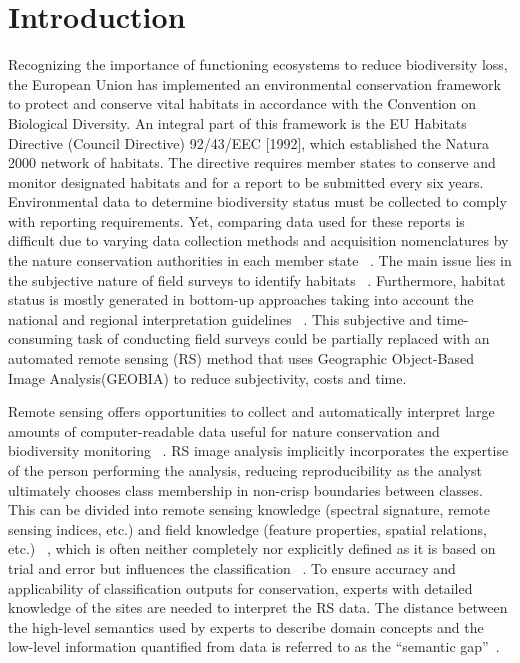 \documentclass[authoryear,preprint,12pt,number]{elsarticle}
\begin{document}
\section{Introduction}
Recognizing the importance of functioning ecosystems to reduce biodiversity 
loss, the European Union has implemented an environmental conservation 
framework to protect and conserve vital habitats in accordance with the 
Convention on Biological Diversity. An integral part of this framework is the 
EU Habitats Directive (Council Directive) 92/43/EEC [1992], which established 
the Natura 2000 network of habitats. The directive requires member states to 
conserve and monitor designated habitats and for a report to be submitted every 
six years. Environmental data to determine biodiversity status must be 
collected to comply with reporting requirements. Yet, comparing data used for 
these reports is difficult due to varying data collection methods and 
acquisition nomenclatures by the nature conservation authorities in each member 
state ~\citep{VandenBorre2011}. The main issue lies in the subjective nature of 
field surveys to identify habitats ~\citep{Cherrill1999, Cherrill1999a, 
Hearn2011, Nieland2015a}. Furthermore, habitat status is mostly 
generated in 
bottom-up approaches taking into account the national and regional 
interpretation guidelines ~\citep{VandenBorre2011, INSPIREdataspecs}. This 
subjective and time-consuming task of conducting field surveys could be 
partially replaced with an automated remote sensing (RS) method that uses 
Geographic Object-Based Image
Analysis(GEOBIA) to reduce subjectivity, costs and time.

Remote sensing offers opportunities to collect and automatically interpret large
amounts of computer-readable data useful for nature conservation and
biodiversity monitoring ~\citep{Corbane2015, VandenBorre2011, Mayer2011}. RS
image analysis implicitly incorporates the expertise of the person performing
the analysis, reducing reproducibility as the analyst ultimately chooses class
membership in non-crisp boundaries between classes. This can be divided into
remote sensing knowledge (spectral signature, remote sensing indices, etc.) and
field knowledge (feature properties, spatial relations, etc.)
~\citep{Andres2013a}, which is often neither completely nor explicitly defined 
as
it is based on trial and error but influences the classification
~\citep{Arvor2013}. To ensure accuracy and applicability of classification
outputs for conservation, experts with detailed knowledge of the sites are
needed to interpret the RS data. The distance between the high-level semantics
used by experts to describe domain concepts and the low-level information
quantified from data is referred to as the ``semantic gap''~\citep{Smeulders00}.
\end{document}
